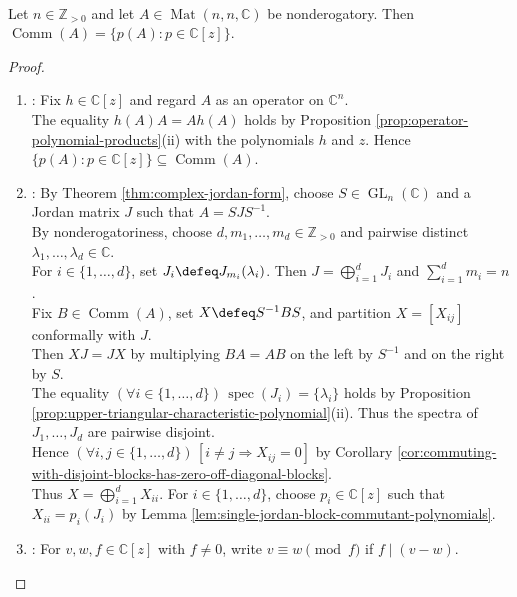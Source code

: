 \begin{theorem} \label{thm:nonderogatory-commutant-polynomials} \\
Let $n\in\mathbb{Z}_{>0}$ and let $A\in\operatorname{Mat}(n,n,\mathbb{C})$ be nonderogatory. Then $\operatorname{Comm}(A)=\{p(A):p\in\mathbb{C}[z]\}$.
\begin{proof}
\begin{enumerate}[label=(\roman*)]
\setlength{\itemsep}{0pt}
\item {}: Fix $h\in\mathbb{C}[z]$ and regard $A$ as an operator on $\mathbb{C}^n$.\\
The equality $h(A)A=Ah(A)$ holds by Proposition \ref{prop:operator-polynomial-products}(ii) with the polynomials $h$ and $z$. Hence $\{p(A):p\in\mathbb{C}[z]\}\subseteq\operatorname{Comm}(A)$.
\item {}: By Theorem \ref{thm:complex-jordan-form}, choose $S\in\operatorname{GL}_n(\mathbb{C})$ and a Jordan matrix $J$ such that $A=SJS^{-1}$.\\
By nonderogatoriness, choose $d,m_1,\ldots,m_d\in\mathbb{Z}_{>0}$ and pairwise distinct $\lambda_1,\ldots,\lambda_d\in\mathbb{C}$.\\
For $i\in\{1,\ldots,d\}$, set $J_i\defeq J_{m_i}(\lambda_i)$. Then $J=\bigoplus\limits_{i=1}^{d}J_i$ and $\sum\limits_{i=1}^{d}m_i=n$.\\
Fix $B\in\operatorname{Comm}(A)$, set $X\defeq S^{-1}BS$, and partition $X=[X_{ij}]$ conformally with $J$.\\
Then $XJ=JX$ by multiplying $BA=AB$ on the left by $S^{-1}$ and on the right by $S$.\\
The equality $(\forall i\in\{1,\ldots,d\})\,\operatorname{spec}(J_i)=\{\lambda_i\}$ holds by Proposition \ref{prop:upper-triangular-characteristic-polynomial}(ii). Thus the spectra of $J_1,\ldots,J_d$ are pairwise disjoint.\\
Hence $(\forall i,j\in\{1,\ldots,d\})\,[i\neq j\Rightarrow X_{ij}=0]$ by Corollary \ref{cor:commuting-with-disjoint-blocks-has-zero-off-diagonal-blocks}.\\
Thus $X=\bigoplus\limits_{i=1}^{d}X_{ii}$. For $i\in\{1,\ldots,d\}$, choose $p_i\in\mathbb{C}[z]$ such that $X_{ii}=p_i(J_i)$ by Lemma \ref{lem:single-jordan-block-commutant-polynomials}.
\item {}: For $v,w,f\in\mathbb{C}[z]$ with $f\neq0$, write $v\equiv w\pmod f$ if $f\mid(v-w)$.\\

\end{enumerate}
\end{proof}
\end{theorem}
